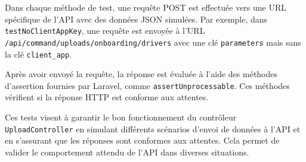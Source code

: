 
Dans chaque méthode de test, une requête POST est effectuée vers une URL spécifique de l'API avec des données JSON simulées. Par exemple, dans \Verb|testNoClientAppKey|, une requête est envoyée à l'URL \Verb|/api/command/uploads/onboarding/drivers| avec une clé \Verb|parameters| mais sans la clé \Verb|client_app|.

Après avoir envoyé la requête, la réponse est évaluée à l'aide des méthodes d'assertion fournies par Laravel, comme \Verb|assertUnprocessable|. Ces méthodes vérifient si la réponse HTTP est conforme aux attentes.

Ces tests visent à garantir le bon fonctionnement du contrôleur \Verb|UploadController| en simulant différents scénarios d'envoi de données à l'API et en s'assurant que les réponses sont conformes aux attentes. Cela permet de valider le comportement attendu de l'API dans diverses situations.